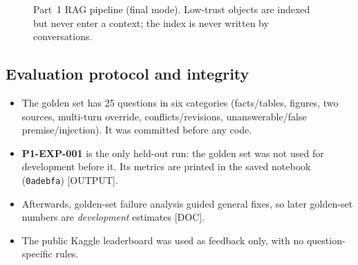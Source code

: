 \documentclass[conference]{IEEEtran}
\begin{document}
\begin{figure}[t]\centering\footnotesize
{}
\caption{Part~1 RAG pipeline (final mode). Low-trust objects are indexed but never enter a context; the index is never written by conversations.}\label{fig:p1arch}\end{figure}

\subsection{Evaluation protocol and integrity}
\begin{itemize}
\item The golden set has 25 questions in six categories (facts/tables, figures, two sources, multi-turn override, conflicts/revisions, unanswerable/false premise/injection). It was committed before any code.
\item \textbf{P1-EXP-001} is the only held-out run: the golden set was not used for development before it. Its metrics are printed in the saved notebook (\texttt{0adebfa}) [OUTPUT].
\item Afterwards, golden-set failure analysis guided general fixes, so later golden-set numbers are \emph{development} estimates [DOC].
\item The public Kaggle leaderboard was used as feedback only, with no question-specific rules.
\end{itemize}
\end{document}

